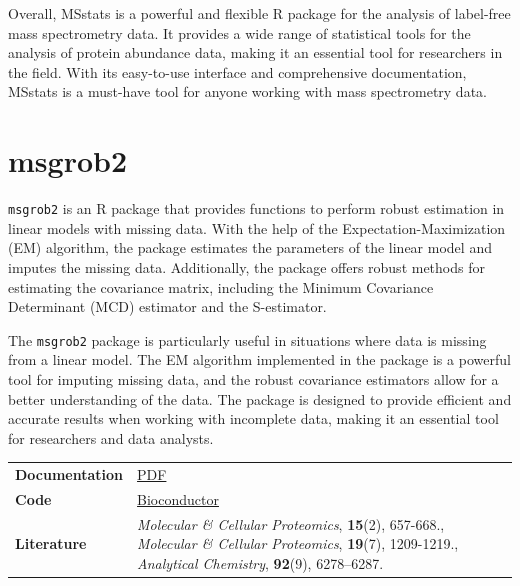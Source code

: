 \documentclass[
]{book}
\begin{document}
Overall, MSstats is a powerful and flexible R package for the analysis of label-free mass spectrometry data. It provides a wide range of statistical tools for the analysis of protein abundance data, making it an essential tool for researchers in the field. With its easy-to-use interface and comprehensive documentation, MSstats is a must-have tool for anyone working with mass spectrometry data.

\hypertarget{msgrob2}{%
\section{msgrob2}\label{msgrob2}}

\texttt{msgrob2} is an R package that provides functions to perform robust estimation in linear models with missing data. With the help of the Expectation-Maximization (EM) algorithm, the package estimates the parameters of the linear model and imputes the missing data. Additionally, the package offers robust methods for estimating the covariance matrix, including the Minimum Covariance Determinant (MCD) estimator and the S-estimator.

The \texttt{msgrob2} package is particularly useful in situations where data is missing from a linear model. The EM algorithm implemented in the package is a powerful tool for imputing missing data, and the robust covariance estimators allow for a better understanding of the data. The package is designed to provide efficient and accurate results when working with incomplete data, making it an essential tool for researchers and data analysts.

\begin{longtable}[]{@{}
  >{\raggedright\arraybackslash}p{}
  >{\raggedright\arraybackslash}p{}@{}}
\toprule\noalign{}
\endhead
\bottomrule\noalign{}
\endlastfoot
\textbf{Documentation} & \href{https://www.bioconductor.org/packages/release/bioc/manuals/msqrob2/man/msqrob2.pdf}{PDF} \\
\textbf{Code} & \href{https://www.bioconductor.org/packages/release/bioc/html/msqrob2.html}{Bioconductor} \\
\textbf{Literature} & \emph{Molecular \& Cellular Proteomics}, \textbf{15}(2), 657-668., \emph{Molecular \& Cellular Proteomics}, \textbf{19}(7), 1209-1219., \emph{Analytical Chemistry}, \textbf{92}(9), 6278--6287. \\
\end{longtable}
\end{document}

